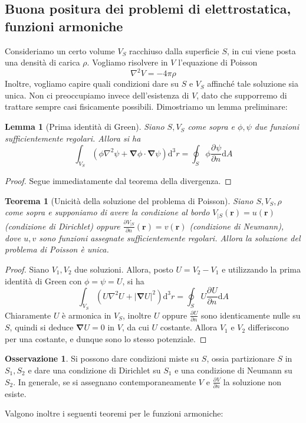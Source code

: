\documentclass[a4paper,11pt]{book}
\newcommand{\dif}{\mathrm{d}}
\newcommand{\der}[3][]{\frac{\partial ^{#1}#2}{\partial {#3}^{#1}}}
\let\oldnabla\nabla
\renewcommand{\nabla}{\vec{\oldnabla}}
\newcommand{\lap}{\oldnabla^2}
\renewcommand{\vec}[1]{\mathbf{#1}}
\theoremstyle{theorem}
\newtheorem{teorema}{Teorema}[section]
\newtheorem{lemma}{Lemma}[section]
\theoremstyle{definition}
\newtheorem{osservazione}{Osservazione}[section]
\begin{document}
\subsection{Buona positura dei problemi di elettrostatica, funzioni armoniche}
Consideriamo un certo volume $V_S$ racchiuso dalla superficie $S$, in cui viene posta una densità di carica $\rho$. Vogliamo risolvere in $V$ l'equazione di Poisson
\[
	\lap V=-4\pi\rho
\]
Inoltre, vogliamo capire quali condizioni dare su $S$ e $V_S$ affinché tale soluzione sia unica. Non ci preoccupiamo invece dell'esistenza di $V$, dato che supporremo di trattare sempre casi fisicamente possibili. Dimostriamo un lemma preliminare:
\begin{lemma}[Prima identità di Green]
	Siano $S,V_S$ come sopra e $\phi,\psi$ due funzioni sufficientemente regolari. Allora si ha
	\[\int_{V_S}\left(\phi\lap\psi+\nabla\phi\cdot\nabla\psi\right)\dif^3r=\oint_S\phi\der{\psi}{n}\dif A\]
\end{lemma}
\begin{proof}
	Segue immediatamente dal teorema della divergenza.
\end{proof}
\begin{teorema}[Unicità della soluzione del problema di Poisson]
	Siano $S,V_S,\rho$ come sopra e supponiamo di avere la condizione al bordo $V_{|S}(\vec{r})=u(\vec{r})$ (condizione di Dirichlet) oppure $\der{V_{|S}}{n}(\vec{r})=v(\vec{r})$ (condizione di Neumann), dove $u,v$ sono funzioni assegnate sufficientemente regolari. Allora la soluzione del problema di Poisson è unica.
\end{teorema}
\begin{proof}
	Siano $V_1,V_2$ due soluzioni. Allora, posto $U=V_2-V_1$ e utilizzando la prima identità di Green con $\phi=\psi=U$, si ha
	\[\int_{V_S}\left(U\lap U+|\nabla U|^2\right)\dif^3r=\oint_SU\der{U}{n}\dif A\]
	Chiaramente $U$ è armonica in $V_S$, inoltre $U$ oppure $\der{U}{n}$ sono identicamente nulle su $S$, quindi si deduce $\nabla{U}=0$ in $V$, da cui $U$ costante. Allora $V_1$ e $V_2$ differiscono per una costante, e dunque sono lo stesso potenziale.
\end{proof}
\begin{osservazione}
	Si possono dare condizioni miste su $S$, ossia partizionare $S$ in $S_1,S_2$ e dare una condizione di Dirichlet su $S_1$ e una condizione di Neumann su $S_2$. In generale, se si assegnano contemporaneamente $V$ e $\der{V}{n}$ la soluzione non esiste.
\end{osservazione}
Valgono inoltre i seguenti teoremi per le funzioni armoniche:
\end{document}
